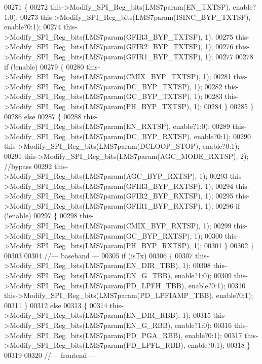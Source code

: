 \begin{DoxyCode}
00271     \{
00272         this->Modify_SPI_Reg_bits(LMS7param(EN_TXTSP), enable?1:0);
00273         this->Modify_SPI_Reg_bits(LMS7param(ISINC_BYP_TXTSP), enable?0:1);
00274         this->Modify_SPI_Reg_bits(LMS7param(GFIR3_BYP_TXTSP), 1);
00275         this->Modify_SPI_Reg_bits(LMS7param(GFIR2_BYP_TXTSP), 1);
00276         this->Modify_SPI_Reg_bits(LMS7param(GFIR1_BYP_TXTSP), 1);
00277 
00278         \textcolor{keywordflow}{if} (!enable)
00279         \{
00280             this->Modify_SPI_Reg_bits(LMS7param(CMIX_BYP_TXTSP), 1);
00281             this->Modify_SPI_Reg_bits(LMS7param(DC_BYP_TXTSP), 1);
00282             this->Modify_SPI_Reg_bits(LMS7param(GC_BYP_TXTSP), 1);
00283             this->Modify_SPI_Reg_bits(LMS7param(PH_BYP_TXTSP), 1);
00284         \}
00285     \}
00286     \textcolor{keywordflow}{else}
00287     \{
00288         this->Modify_SPI_Reg_bits(LMS7param(EN_RXTSP), enable?1:0);
00289         this->Modify_SPI_Reg_bits(LMS7param(DC_BYP_RXTSP), enable?0:1);
00290         this->Modify_SPI_Reg_bits(LMS7param(DCLOOP\_STOP), enable?0:1);
00291         this->Modify_SPI_Reg_bits(LMS7param(AGC_MODE_RXTSP), 2); \textcolor{comment}{//bypass}
00292         this->Modify_SPI_Reg_bits(LMS7param(AGC_BYP_RXTSP), 1);
00293         this->Modify_SPI_Reg_bits(LMS7param(GFIR3_BYP_RXTSP), 1);
00294         this->Modify_SPI_Reg_bits(LMS7param(GFIR2_BYP_RXTSP), 1);
00295         this->Modify_SPI_Reg_bits(LMS7param(GFIR1_BYP_RXTSP), 1);
00296         \textcolor{keywordflow}{if} (!enable)
00297         \{
00298             this->Modify_SPI_Reg_bits(LMS7param(CMIX_BYP_RXTSP), 1);
00299             this->Modify_SPI_Reg_bits(LMS7param(GC_BYP_RXTSP), 1);
00300             this->Modify_SPI_Reg_bits(LMS7param(PH_BYP_RXTSP), 1);
00301         \}
00302     \}
00303 
00304     \textcolor{comment}{//--- baseband ---}
00305     \textcolor{keywordflow}{if} (isTx)
00306     \{
00307         this->Modify_SPI_Reg_bits(LMS7param(EN_DIR_TBB), 1);
00308         this->Modify_SPI_Reg_bits(LMS7param(EN_G_TBB), enable?1:0);
00309         this->Modify_SPI_Reg_bits(LMS7param(PD_LPFH_TBB), enable?0:1);
00310         this->Modify_SPI_Reg_bits(LMS7param(PD_LPFIAMP_TBB), enable?0:1);
00311     \}
00312     \textcolor{keywordflow}{else}
00313     \{
00314         this->Modify_SPI_Reg_bits(LMS7param(EN_DIR_RBB), 1);
00315         this->Modify_SPI_Reg_bits(LMS7param(EN_G_RBB), enable?1:0);
00316         this->Modify_SPI_Reg_bits(LMS7param(PD_PGA_RBB), enable?0:1);
00317         this->Modify_SPI_Reg_bits(LMS7param(PD_LPFL_RBB), enable?0:1);
00318     \}
00319 
00320     \textcolor{comment}{//--- frontend ---}

\end{DoxyCode}
